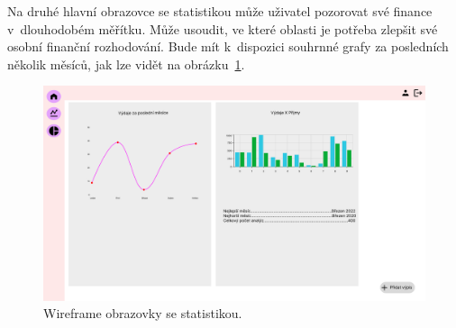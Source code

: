 Na druhé hlavní obrazovce se statistikou může uživatel pozorovat své finance v~dlouhodobém měřítku. Může usoudit, ve které oblasti je potřeba zlepšit své osobní finanční rozhodování. Bude mít k~dispozici souhrnné grafy za posledních několik měsíců, jak lze vidět na obrázku~\ref{fig;wireframe2}.
\begin{figure}[H]
\centering
\includegraphics[width=\textwidth]{obrazky-figures/navrhui2.pdf}
\caption{Wireframe obrazovky se statistikou.}
\label{fig;wireframe2}
\end{figure}

